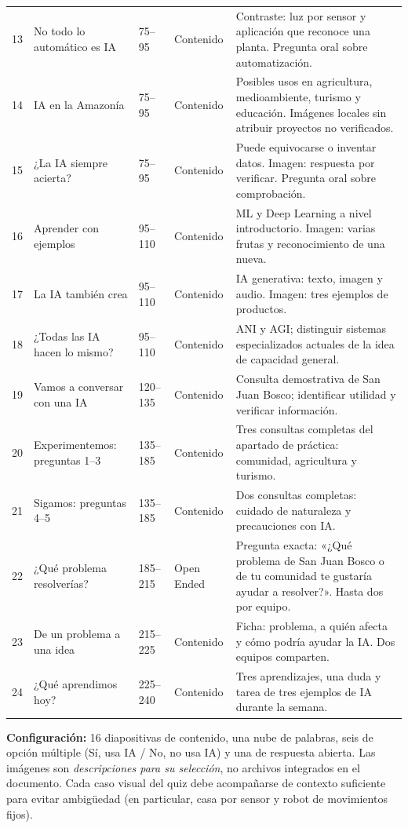 \documentclass[11pt,a4paper]{article}
\begin{document}
\begin{longtable}{@{}p{0.55cm}>{\raggedright\arraybackslash}p{2.5cm}p{1.35cm}>{\raggedright\arraybackslash}p{2.0cm}>{\raggedright\arraybackslash}p{6.9cm}@{}}
13 & No todo lo automático es IA & 75--95 & Contenido & Contraste: luz por sensor y aplicación que reconoce una planta. Pregunta oral sobre automatización.\\
14 & IA en la Amazonía & 75--95 & Contenido & Posibles usos en agricultura, medioambiente, turismo y educación. Imágenes locales sin atribuir proyectos no verificados.\\
15 & ¿La IA siempre acierta? & 75--95 & Contenido & Puede equivocarse o inventar datos. Imagen: respuesta por verificar. Pregunta oral sobre comprobación.\\
16 & Aprender con ejemplos & 95--110 & Contenido & ML y Deep Learning a nivel introductorio. Imagen: varias frutas y reconocimiento de una nueva.\\
17 & La IA también crea & 95--110 & Contenido & IA generativa: texto, imagen y audio. Imagen: tres ejemplos de productos.\\
18 & ¿Todas las IA hacen lo mismo? & 95--110 & Contenido & ANI y AGI; distinguir sistemas especializados actuales de la idea de capacidad general.\\
19 & Vamos a conversar con una IA & 120--135 & Contenido & Consulta demostrativa de San Juan Bosco; identificar utilidad y verificar información.\\
20 & Experimentemos: preguntas 1--3 & 135--185 & Contenido & Tres consultas completas del apartado de práctica: comunidad, agricultura y turismo.\\
21 & Sigamos: preguntas 4--5 & 135--185 & Contenido & Dos consultas completas: cuidado de naturaleza y precauciones con IA.\\
22 & ¿Qué problema resolverías? & 185--215 & Open Ended & Pregunta exacta: «¿Qué problema de San Juan Bosco o de tu comunidad te gustaría ayudar a resolver?». Hasta dos por equipo.\\
23 & De un problema a una idea & 215--225 & Contenido & Ficha: problema, a quién afecta y cómo podría ayudar la IA. Dos equipos comparten.\\
24 & ¿Qué aprendimos hoy? & 225--240 & Contenido & Tres aprendizajes, una duda y tarea de tres ejemplos de IA durante la semana.\\
\bottomrule
\end{longtable}
\normalsize

\textbf{Configuración:} 16 diapositivas de contenido, una nube de palabras, seis de opción múltiple (Sí, usa IA / No, no usa IA) y una de respuesta abierta. Las imágenes son \emph{descripciones para su selección}, no archivos integrados en el documento. Cada caso visual del quiz debe acompañarse de contexto suficiente para evitar ambigüedad (en particular, casa por sensor y robot de movimientos fijos).
\end{document}
